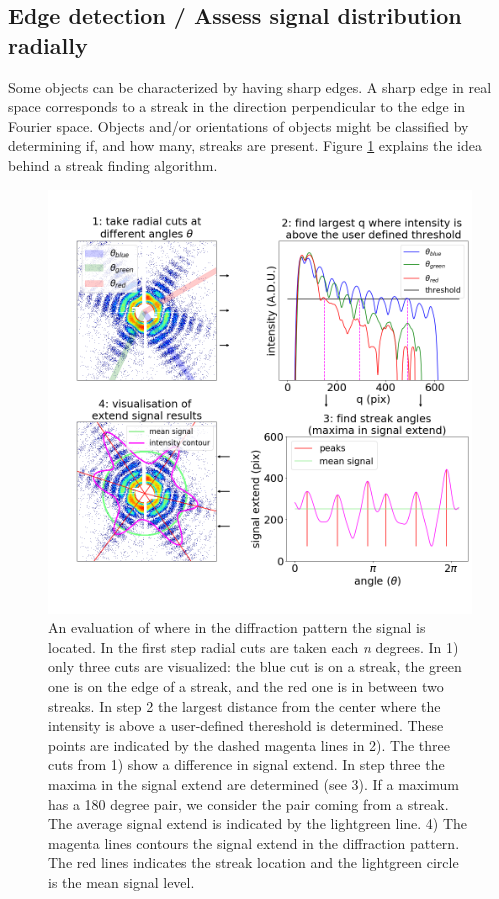 \subsection{Edge detection / Assess signal distribution radially}
Some objects can be characterized by having sharp edges. A sharp edge in real space corresponds to a streak in the direction perpendicular to the edge in Fourier space. Objects and/or orientations of objects might be classified by determining if, and how many, streaks are present. Figure \ref{fig:edge_detection} explains the idea behind a streak finding algorithm.

\begin{figure}[!h]
\centering
\includegraphics[width=120mm]{Chapter_08_ImageClassification_Edge_Detection.png}
\caption{An evaluation of where in the diffraction pattern the signal is located. In the first step radial cuts are taken each \textit{n} degrees. In 1) only three cuts are visualized: the blue cut is on a streak, the green one is on the edge of a streak, and the red one is in between two streaks. In step 2 the largest distance from the center where the intensity is above a user-defined thereshold is determined. These points are indicated by the dashed magenta lines in 2). The three cuts from 1) show a difference in signal extend. In step three the maxima in the signal extend are determined (see 3). If a maximum has a 180 degree pair, we consider the pair coming from a streak. The average signal extend is indicated by the lightgreen line. 4) The magenta lines contours the signal extend in the diffraction pattern. The red lines indicates the streak location and the lightgreen circle is the mean signal level.}\label{fig:edge_detection}
\end{figure}

